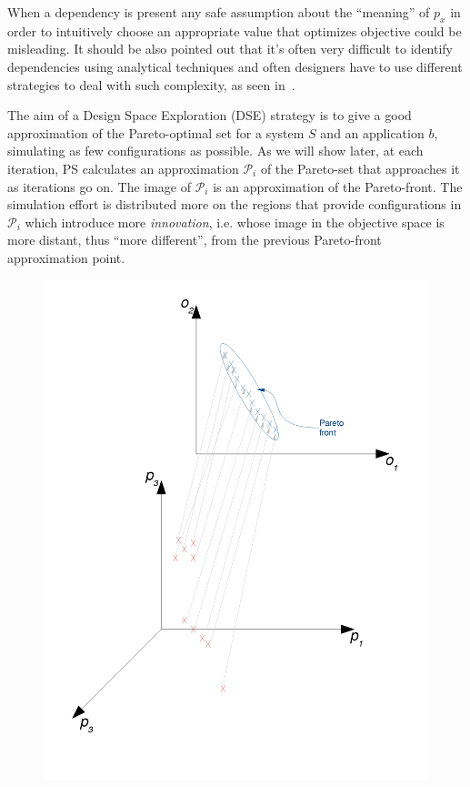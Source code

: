 When a dependency is present any safe assumption about the ``meaning'' of
$p_x$ in order to intuitively choose an appropriate value that
optimizes objective could be misleading.  It should be also pointed
out that it's often very difficult to identify dependencies using
analytical techniques and often designers have to use different
strategies to deal with such complexity, as seen
in~.

The aim of a Design Space Exploration (DSE) strategy is to give a
good approximation of the Pareto-optimal set for a system $S$ and an
application $b$, simulating as few configurations as possible.
As we will show later, at each iteration, PS calculates an approximation $\mathscr{P}_i$ of the Pareto-set that approaches it as iterations go on. The image of $\mathscr{P}_i$ is an approximation of the Pareto-front.
The simulation effort is distributed more on the regions that provide configurations in $\mathscr{P}_i$ which introduce more \emph{innovation}, i.e. whose image in the objective space is more distant, thus ``more different'', from the previous Pareto-front approximation point.





\begin{figure}[t]
\center
\includegraphics[width=0.5\columnwidth]{img/Pareto_set_and_front}
\end{figure}

